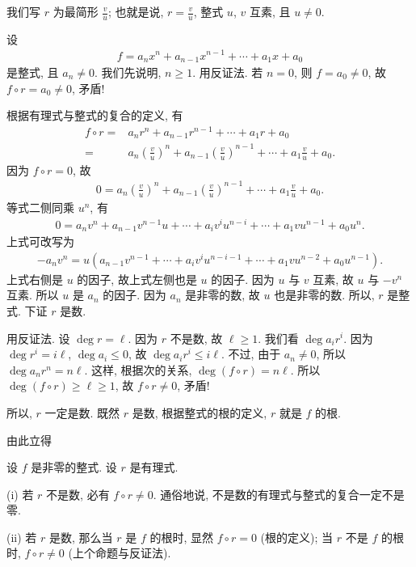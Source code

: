 \begin{pf}
    我们写 $r$ 为最简形 $\frac{v}{u}$; 也就是说, $r = \frac{v}{u}$, 整式 $u$, $v$ 互素, 且 $u \neq 0$.

    设
    \begin{align*}
        f = a_n x^n + a_{n-1} x^{n-1} + \cdots + a_1 x + a_0
    \end{align*}
    是整式, 且 $a_n \neq 0$. 我们先说明, $n \geq 1$. 用反证法. 若 $n = 0$, 则 $f = a_0 \neq 0$, 故 $f \circ r = a_0 \neq 0$, 矛盾!

    根据有理式与整式的复合的定义, 有
    \begin{align*}
        f \circ r
        = {} & a_n r^n + a_{n-1} r^{n-1} + \cdots + a_1 r + a_0                                                              \\
        = {} & a_n \left( \frac{v}{u} \right)^n + a_{n-1} \left( \frac{v}{u} \right)^{n-1} + \cdots + a_1 \frac{v}{u} + a_0.
    \end{align*}
    因为 $f \circ r = 0$, 故
    \begin{align*}
        0 = a_n \left( \frac{v}{u} \right)^n + a_{n-1} \left( \frac{v}{u} \right)^{n-1} + \cdots + a_1 \frac{v}{u} + a_0.
    \end{align*}
    等式二侧同乘 $u^n$, 有
    \begin{align*}
        0 = a_n v^n + a_{n-1} v^{n-1} u + \cdots + a_{i} v^{i} u^{n-i} + \cdots + a_1 v u^{n-1} + a_0 u^n.
    \end{align*}
    上式可改写为
    \begin{align*}
        -a_n v^n = u (a_{n-1} v^{n-1} + \cdots + a_{i} v^{i} u^{n-i-1} + \cdots + a_1 v u^{n-2} + a_0 u^{n-1}).
    \end{align*}
    上式右侧是 $u$ 的因子, 故上式左侧也是 $u$ 的因子. 因为 $u$ 与 $v$ 互素, 故 $u$ 与 $-v^n$ 互素. 所以 $u$ 是 $a_n$ 的因子. 因为 $a_n$ 是非零的数, 故 $u$ 也是非零的数. 所以, $r$ 是整式. 下证 $r$ 是数.

    用反证法. 设 $\deg r = \ell$. 因为 $r$ 不是数, 故 $\ell \geq 1$. 我们看 $\deg {a_i r^i}$. 因为 $\deg r^i = i\ell$, $\deg a_i \leq 0$, 故 $\deg {a_i r^i} \leq i\ell$. 不过, 由于 $a_n \neq 0$, 所以 $\deg {a_n r^n} = n\ell$. 这样, 根据次的关系, $\deg {(f \circ r)} = n\ell$. 所以 $\deg {(f \circ r)} \geq \ell \geq 1$, 故 $f \circ r \neq 0$, 矛盾!

    所以, $r$ 一定是数. 既然 $r$ 是数, 根据整式的根的定义, $r$ 就是 $f$ 的根.
\end{pf}

由此立得
\begin{proposition}
    设 $f$ 是非零的整式. 设 $r$ 是有理式.

    (i) 若 $r$ 不是数, 必有 $f \circ r \neq 0$. 通俗地说, 不是数的有理式与整式的复合一定不是零.

    (ii) 若 $r$ 是数, 那么当 $r$ 是 $f$ 的根时, 显然 $f \circ r = 0$ (根的定义); 当 $r$ 不是 $f$ 的根时, $f \circ r \neq 0$ (上个命题与反证法).
\end{proposition}

